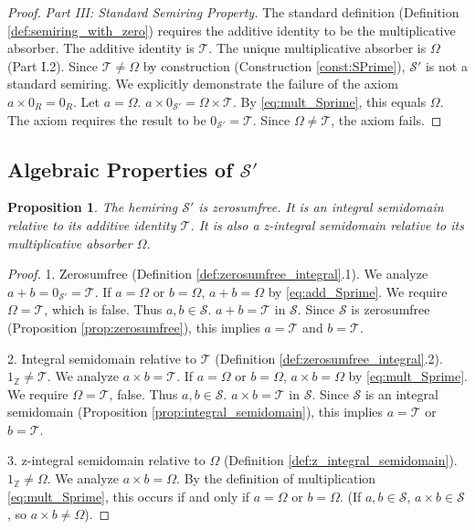 \documentclass[11pt, a4paper]{article}
\theoremstyle{plain}
\newtheorem{proposition}[theorem]{Proposition}
\theoremstyle{definition}
\numberwithin{equation}{section}
\newcommand{\Z}{\mathbb{Z}}
\newcommand{\Tobj}{\mathcal{T}} %
\newcommand{\OmegaObj}{\Omega} %
\newcommand{\SemiringS}{\mathcal{S}}
\newcommand{\SemiringSPrime}{\mathcal{S}'}
\begin{document}
\begin{proof}
\emph{Part III: Standard Semiring Property.}
The standard definition (Definition \ref{def:semiring_with_zero}) requires the additive identity to be the multiplicative absorber.
The additive identity is $\Tobj$. The unique multiplicative absorber is $\OmegaObj$ (Part I.2).
Since $\Tobj \neq \OmegaObj$ by construction (Construction \ref{const:SPrime}), $\SemiringSPrime$ is not a standard semiring.
We explicitly demonstrate the failure of the axiom $a\times 0_R = 0_R$. Let $a=\OmegaObj$.
$a\times 0_{\SemiringSPrime} = \OmegaObj\times\Tobj$. By \eqref{eq:mult_Sprime}, this equals $\OmegaObj$.
The axiom requires the result to be $0_{\SemiringSPrime}=\Tobj$. Since $\OmegaObj \neq \Tobj$, the axiom fails.
\end{proof}

\subsection{Algebraic Properties of $\SemiringSPrime$}

\begin{proposition}\label{prop:Sprime_zerosumfree_integral}
The hemiring $\SemiringSPrime$ is zerosumfree. It is an integral semidomain relative to its additive identity $\Tobj$. It is also a z-integral semidomain relative to its multiplicative absorber $\OmegaObj$.
\end{proposition}
\begin{proof}
1. Zerosumfree (Definition \ref{def:zerosumfree_integral}.1). We analyze $a+b=0_{\SemiringSPrime}=\Tobj$.
If $a=\OmegaObj$ or $b=\OmegaObj$, $a+b=\OmegaObj$ by \eqref{eq:add_Sprime}. We require $\OmegaObj=\Tobj$, which is false.
Thus $a, b \in \SemiringS$. $a+b=\Tobj$ in $\SemiringS$. Since $\SemiringS$ is zerosumfree (Proposition \ref{prop:zerosumfree}), this implies $a=\Tobj$ and $b=\Tobj$.

2. Integral semidomain relative to $\Tobj$ (Definition \ref{def:zerosumfree_integral}.2). $1_{\Z} \neq \Tobj$.
We analyze $a\times b=\Tobj$.
If $a=\OmegaObj$ or $b=\OmegaObj$, $a\times b=\OmegaObj$ by \eqref{eq:mult_Sprime}. We require $\OmegaObj=\Tobj$, false.
Thus $a, b \in \SemiringS$. $a\times b=\Tobj$ in $\SemiringS$. Since $\SemiringS$ is an integral semidomain (Proposition \ref{prop:integral_semidomain}), this implies $a=\Tobj$ or $b=\Tobj$.

3. z-integral semidomain relative to $\OmegaObj$ (Definition \ref{def:z_integral_semidomain}). $1_{\Z} \neq \OmegaObj$.
We analyze $a\times b = \OmegaObj$.
By the definition of multiplication \eqref{eq:mult_Sprime}, this occurs if and only if $a=\OmegaObj$ or $b=\OmegaObj$. (If $a, b \in \SemiringS$, $a\times b \in \SemiringS$, so $a\times b \neq \OmegaObj$).
\end{proof}
\end{document}
